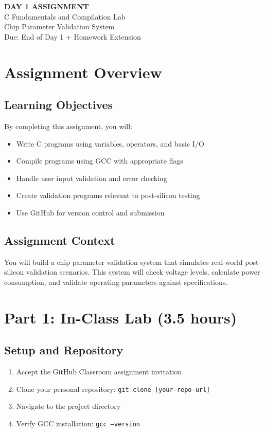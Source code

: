 \documentclass[11pt,a4paper]{article}
\begin{document}
\begin{center}
    {\Huge\bfseries\color{codeblue} DAY 1 ASSIGNMENT}\\[0.5cm]
    {\Large C Fundamentals and Compilation Lab}\\[0.3cm]
    {\large Chip Parameter Validation System}\\[0.2cm]
    {\normalsize Due: End of Day 1 + Homework Extension}
\end{center}

\vspace{1cm}

\section{Assignment Overview}

\subsection{Learning Objectives}
By completing this assignment, you will:
\begin{itemize}
    \item Write C programs using variables, operators, and basic I/O
    \item Compile programs using GCC with appropriate flags
    \item Handle user input validation and error checking
    \item Create validation programs relevant to post-silicon testing
    \item Use GitHub for version control and submission
\end{itemize}

\subsection{Assignment Context}
You will build a chip parameter validation system that simulates real-world post-silicon validation scenarios. This system will check voltage levels, calculate power consumption, and validate operating parameters against specifications.

\section{Part 1: In-Class Lab (3.5 hours)}

\subsection{Setup and Repository}
\begin{enumerate}
    \item Accept the GitHub Classroom assignment invitation
    \item Clone your personal repository: \texttt{git clone [your-repo-url]}
    \item Navigate to the project directory
    \item Verify GCC installation: \texttt{gcc --version}
\end{enumerate}
\end{document}
